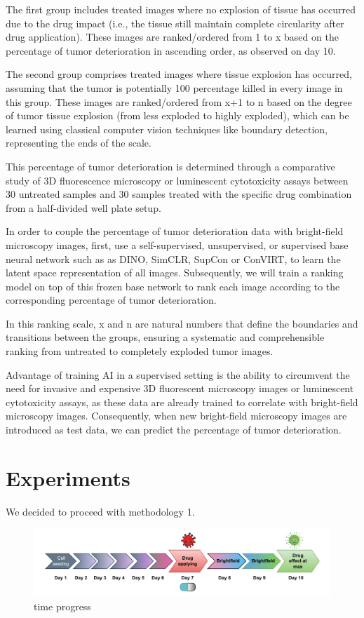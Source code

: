 \documentclass[12pt,twoside,a4paper,parskip]{scrbook} %
\begin{document}
The first group includes treated images where no explosion of tissue has occurred due to the drug impact (i.e., the tissue still maintain complete circularity after drug application). These images are ranked/ordered from 1 to x based on the percentage of tumor deterioration in ascending order, as observed on day 10.

The second group comprises treated images where tissue explosion has occurred, assuming that the tumor is potentially 100 percentage killed in every image in this group. These images are ranked/ordered from x+1 to n based on the degree of tumor tissue explosion (from less exploded to highly exploded), which can be learned using classical computer vision techniques like boundary detection, representing the ends of the scale.

This percentage of tumor deterioration is determined through a comparative study of 3D fluorescence microscopy or luminescent cytotoxicity assays between 30 untreated samples and 30 samples treated with the specific drug combination from a half-divided well plate setup.

In order to couple the  percentage of tumor deterioration data with bright-field microscopy images, first, use a self-supervised, unsupervised, or supervised base neural network such as as DINO\cite{caron2021emerging}, SimCLR\cite{chen2020simple}, SupCon\cite{khosla2021supervised} or ConVIRT\cite{zhang2022contrastive}, to learn the latent space representation of all images. Subsequently, we will train a ranking model on top of this frozen base network to rank each image according to the corresponding percentage of tumor deterioration. 


In this ranking scale, x and n are natural numbers that define the boundaries and transitions between the groups, ensuring a systematic and comprehensible ranking from untreated to completely exploded tumor images.

Advantage of training AI in a supervised setting is the ability to circumvent the need for invasive and expensive 3D fluorescent microscopy images or luminescent cytotoxicity assays, as these data are already trained to correlate with bright-field microscopy images. Consequently, when new bright-field microscopy images are introduced as test data, we can predict the percentage of tumor deterioration.

\chapter{Experiments}\label{ch:Experiments}
We decided to proceed with methodology 1.
\begin{figure}[H]
  \centering
  \includegraphics[scale=0.9]{figures/evolution.pdf} 
  \caption{time progress}
  \label{fig:evolution}
\end{figure}
\end{document}
